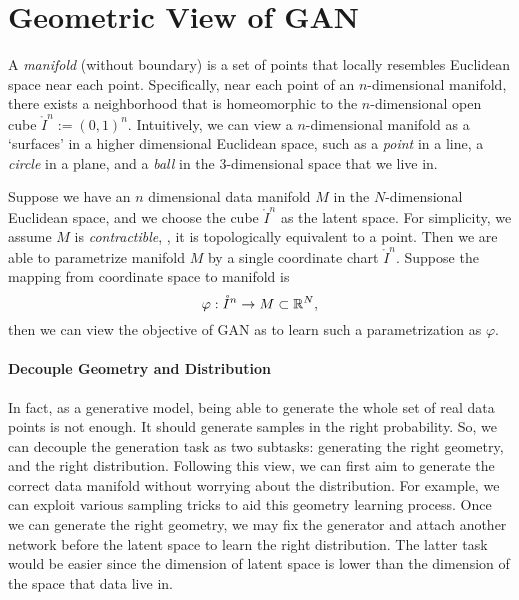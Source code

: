 \section{Geometric View of GAN} \label{sec:geom}

A \emph{manifold} (without boundary) is a set of points that
locally resembles Euclidean space near each point.
Specifically,
near each point of an $n$-dimensional manifold,
there exists a neighborhood that is homeomorphic to the $n$-dimensional open
cube $\mathring{I}^n:=(0,1)^n$.
Intuitively,
we can view a $n$-dimensional manifold as a `surfaces'
in a higher dimensional Euclidean space,
such as a \emph{point} in a line,
a \emph{circle} in a plane,
and a \emph{ball} in the $3$-dimensional space that we live in.

Suppose we have an $n$ dimensional data manifold $M$ in the $N$-dimensional
Euclidean space,
and we choose the cube $\mathring{I}^n$ as the latent space.
For simplicity,
we assume $M$ is \emph{contractible},
\ie,
it is topologically equivalent to a point.
Then we are able to parametrize manifold $M$ by a
single coordinate chart $\mathring{I}^n$.
Suppose the mapping from coordinate space to manifold is
\begin{equation}
    \varphi:\mathring{I}^n\to M\subset {\mathbb{R}}^N,
\end{equation}
then we can view the objective of GAN as to learn such a
parametrization as $\varphi$.

\paragraph{Decouple Geometry and Distribution}
In fact,
as a generative model,
being able to generate the whole set of real data points is not enough.
It should generate samples in the right probability.
So,
we can decouple the generation task as two subtasks:
generating the right geometry,
and the right distribution.
Following this view,
we can first aim to generate the correct data manifold
without worrying about the distribution.
For example,
we can exploit various sampling tricks to aid this geometry learning process.
Once we can generate the right geometry,
we may fix the generator and attach another network before the latent space
to learn the right distribution.
The latter task would be easier since the dimension of latent space is
lower than the dimension of the space that data live in.

